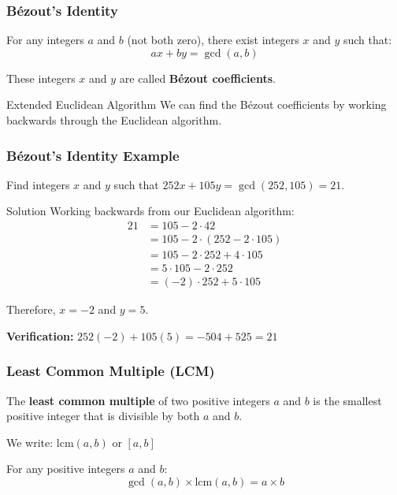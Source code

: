\documentclass[10pt]{beamer}
\begin{document}
\begin{frame}
    \frametitle{Bézout's Identity}
    \begin{theorem}
        For any integers $a$ and $b$ (not both zero), there exist integers $x$ and $y$ such that:
        $$ax + by = \gcd(a,b)$$

        These integers $x$ and $y$ are called \textbf{Bézout coefficients}.
    \end{theorem}

    \vspace{0.5cm}

    \begin{block}{Extended Euclidean Algorithm}
        We can find the Bézout coefficients by working backwards through the Euclidean algorithm.
    \end{block}
\end{frame}

\begin{frame}
    \frametitle{Bézout's Identity Example}
    \begin{example}
        Find integers $x$ and $y$ such that $252x + 105y = \gcd(252,105) = 21$.
    \end{example}

    \begin{block}{Solution}
        Working backwards from our Euclidean algorithm:
        \begin{align}
            21 & = 105 - 2 \cdot 42                  \\
               & = 105 - 2 \cdot (252 - 2 \cdot 105) \\
               & = 105 - 2 \cdot 252 + 4 \cdot 105   \\
               & = 5 \cdot 105 - 2 \cdot 252         \\
               & = (-2) \cdot 252 + 5 \cdot 105
        \end{align}

        Therefore, $x = -2$ and $y = 5$.

        \textbf{Verification:} $252(-2) + 105(5) = -504 + 525 = 21$ \checkmark
    \end{block}
\end{frame}

\begin{frame}
    \frametitle{Least Common Multiple (LCM)}
    \begin{definition}
        The \textbf{least common multiple} of two positive integers $a$ and $b$ is the smallest positive integer that is divisible by both $a$ and $b$.

        We write: $\text{lcm}(a,b)$ or $[a,b]$
    \end{definition}

    \vspace{0.5cm}

    \begin{theorem}
        For any positive integers $a$ and $b$:
        $$\gcd(a,b) \times \text{lcm}(a,b) = a \times b$$
    \end{theorem}

\end{frame}
\end{document}

